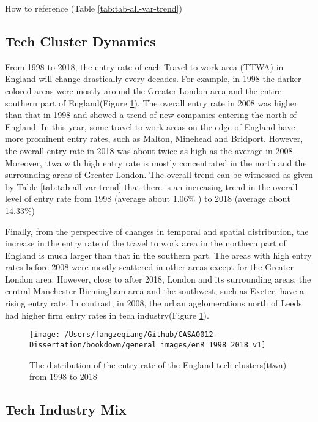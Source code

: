 \documentclass[
  12pt,
  oneside]{book}
\begin{document}
How to reference (Table \ref{tab:tab-all-var-trend})

\hypertarget{tech-cluster-dynamics}{%
\subsection{Tech Cluster Dynamics}\label{tech-cluster-dynamics}}

From 1998 to 2018, the entry rate of each Travel to work area (TTWA) in England will change drastically every decades. For example, in 1998 the darker colored areas were mostly around the Greater London area and the entire southern part of England(Figure \ref{fig:fig-enR-1998-2018-v1}). The overall entry rate in 2008 was higher than that in 1998 and showed a trend of new companies entering the north of England. In this year, some travel to work areas on the edge of England have more prominent entry rates, such as Malton, Minehead and Bridport. However, the overall entry rate in 2018 was about twice as high as the average in 2008. Moreover, ttwa with high entry rate is mostly concentrated in the north and the surrounding areas of Greater London. The overall trend can be witnessed as given by Table \ref{tab:tab-all-var-trend} that there is an increasing trend in the overall level of entry rate from 1998 (average about 1.06\% ) to 2018
(average about 14.33\%)

Finally, from the perspective of changes in temporal and spatial distribution, the increase in the entry rate of the travel to work area in the northern part of England is much larger than that in the southern part. The areas with high entry rates before 2008 were mostly scattered in other areas except for the Greater London area. However, close to after 2018, London and its surrounding areas, the central Manchester-Birmingham area and the southwest, such as Exeter, have a rising entry rate. In contrast, in 2008, the urban agglomerations north of Leeds had higher firm entry rates in tech industry(Figure \ref{fig:fig-enR-1998-2018-v1}).

\begin{figure}
\texttt{[image: /Users/fangzeqiang/Github/CASA0012-Dissertation/bookdown/general\_images/enR\_1998\_2018\_v1]} \caption{The distribution of the entry rate of the England tech clusters(ttwa) from 1998 to 2018}\label{fig:fig-enR-1998-2018-v1}
\end{figure}

\hypertarget{tech-industry-mix}{%
\subsection{Tech Industry Mix}\label{tech-industry-mix}}
\end{document}
